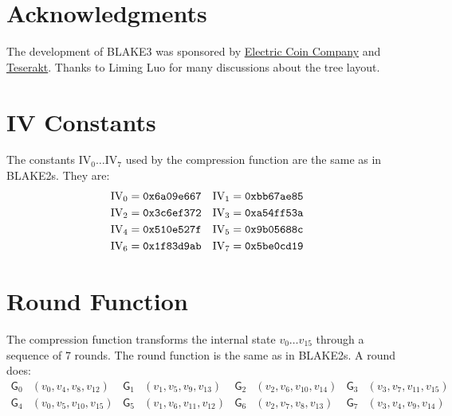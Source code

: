 \documentclass[11pt,notitlepage,a4paper]{article}
\newcommand{\GG}{\mathsf{G}}
\newcommand{\IV}{\text{IV}}
\begin{document}
\section*{Acknowledgments}\label{sec:acknowledgments}

The development of BLAKE3 was sponsored by
\href{https://electriccoin.co/}{Electric Coin Company} and
\href{https://teserakt.io}{Teserakt}. Thanks to Liming Luo for many discussions
about the tree layout.




\begin{appendices}

\section{IV Constants}\label{sec:ivconstants}

    The constants $\IV_0 \ldots \IV_7$ used by the compression function are the
    same as in BLAKE2s. They are:
\begin{align*}
    \IV_0 &= \text{\texttt{0x6a09e667}} &
    \IV_1 &= \text{\texttt{0xbb67ae85}} \\
    \IV_2 &= \text{\texttt{0x3c6ef372}} &
    \IV_3 &= \text{\texttt{0xa54ff53a}} \\
    \IV_4 &= \text{\texttt{0x510e527f}} &
    \IV_5 &= \text{\texttt{0x9b05688c}} \\
    \IV_6 &= \text{\texttt{0x1f83d9ab}} &
    \IV_7 &= \text{\texttt{0x5be0cd19}}
\end{align*}

\section{Round Function}\label{sec:roundfn}

    The compression function transforms the internal state $v_{0} \ldots
    v_{15}$ through a sequence of 7 rounds. The round function is the same as
    in BLAKE2s. A round does:
\begin{align*}
    \GG_{0}&(v_{0}, v_{4}, v_{8}, v_{12}) &
    \GG_{1}&(v_{1}, v_{5}, v_{9}, v_{13}) &
    \GG_{2}&(v_{2}, v_{6}, v_{10}, v_{14}) &
    \GG_{3}&(v_{3}, v_{7}, v_{11}, v_{15}) \\
    \GG_{4}&(v_{0}, v_{5}, v_{10}, v_{15}) &
    \GG_{5}&(v_{1}, v_{6}, v_{11}, v_{12}) &
    \GG_{6}&(v_{2}, v_{7}, v_{8}, v_{13}) &
    \GG_{7}&(v_{3}, v_{4}, v_{9}, v_{14})
\end{align*}


\end{appendices}
\end{document}
